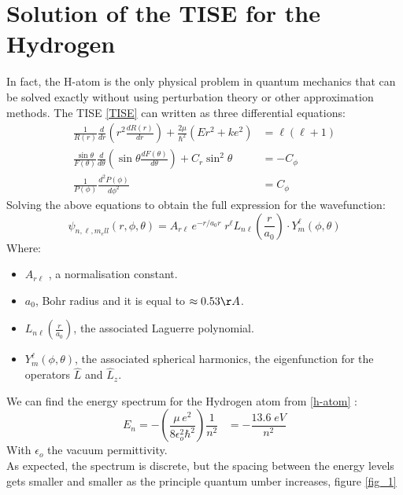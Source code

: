 \section{Solution of the TISE for the Hydrogen}
In fact, the H-atom is the only physical problem in quantum mechanics that can be solved exactly without using perturbation theory or other approximation methods. The TISE \eqref{TISE} can written as three differential equations:
\begin{subequations}
	\begin{align}
	\frac{1}{R(r)} \frac{d}{dr}\left( r^2\frac{d R(r)}{dr}\right) +\frac{2\mu}{\hbar ^2}\left( Er^2+k e^2\right)  &= \ell(\ell+1)\\
	\frac{\sin \theta}{F(\theta)} \frac{d}{d \theta} \left( \sin \theta \frac{d F( \theta)}{d \theta}\right) + C_r \sin^2\theta &= - C_\phi \\
	\frac{1}{P(\phi)} \frac{d^2 P(\phi)}{d \phi ^2}&= C_\phi
	\end{align}
\end{subequations}
Solving the above equations to obtain the full expression for the wavefunction:
\begin{equation}
\boxed{
	\psi_{ n, \ell, m_ell}(r, \phi, \theta) = A_{r \ell} \, e^{-r/a_0 r}\; r^\ell L _{n \ell} ( \frac{r}{a_0}) \cdot Y ^\ell_m ( \phi, \theta) }
\label{h-atom}
\end{equation}
Where:
\begin{itemize}
	\item $A_{r \ell}$ , a normalisation constant.
	\item $a_0$, Bohr radius and it is equal to $ \approx0.53 \AA$.
	\item $L _{n \ell} ( \frac{r}{a_0})$, the associated Laguerre polynomial.  
	\item $Y ^\ell_m ( \phi, \theta)$, the associated spherical harmonics, the eigenfunction for the operators $ \hat L$ and $\hat L_z$. 
\end{itemize}
We can find the energy spectrum for the Hydrogen atom from \ref{h-atom} :
\begin{equation}
\boxed{E_n = -\left(\frac{\mu\, e^2 }{8 \epsilon_o ^2 \hbar^2}\right)  \frac{1}{n^2} \; \; \; = - \frac{13.6 \; eV}{n ^2}}
\end{equation}
With $ \epsilon_o$ the vacuum permittivity. \\
As expected, the spectrum is discrete, but the spacing between the energy levels gets smaller and smaller as the principle quantum umber increases, figure \ref{fig_1} \\

